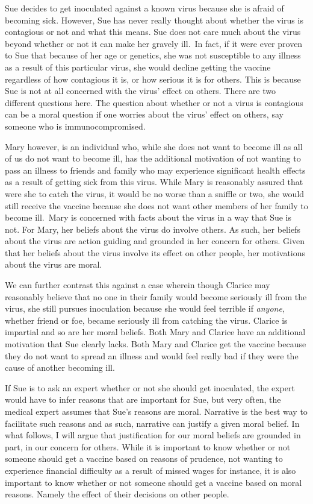 \documentclass[
  12pt,
]{book}
\theoremstyle{definition}
\theoremstyle{definition}
\theoremstyle{definition}
\theoremstyle{definition}
\theoremstyle{remark}
\begin{document}
Sue decides to get inoculated against a known virus because she is afraid of becoming sick. However, Sue has never really thought about whether the virus is contagious or not and what this means. Sue does not care much about the virus beyond whether or not it can make her gravely ill.~In fact, if it were ever proven to Sue that because of her age or genetics, she was not susceptible to any illness as a result of this particular virus, she would decline getting the vaccine regardless of how contagious it is, or how serious it is for others. This is because Sue is not at all concerned with the virus' effect on others. There are two different questions here. The question about whether or not a virus is contagious can be a moral question if one worries about the virus' effect on others, say someone who is immunocompromised.

Mary however, is an individual who, while she does not want to become ill as all of us do not want to become ill, has the additional motivation of not wanting to pass an illness to friends and family who may experience significant health effects as a result of getting sick from this virus. While Mary is reasonably assured that were she to catch the virus, it would be no worse than a sniffle or two, she would still receive the vaccine because she does not want other members of her family to become ill.~Mary is concerned with facts about the virus in a way that Sue is not. For Mary, her beliefs about the virus do involve others. As such, her beliefs about the virus are action guiding and grounded in her concern for others. Given that her beliefs about the virus involve its effect on other people, her motivations about the virus are moral.

We can further contrast this against a case wherein though Clarice may reasonably believe that no one in their family would become seriously ill from the virus, she still pursues inoculation because she would feel terrible if \emph{anyone}, whether friend or foe, became seriously ill from catching the virus. Clarice is impartial and so are her moral beliefs. Both Mary and Clarice have an additional motivation that Sue clearly lacks. Both Mary and Clarice get the vaccine because they do not want to spread an illness and would feel really bad if they were the cause of another becoming ill.

If Sue is to ask an expert whether or not she should get inoculated, the expert would have to infer reasons that are important for Sue, but very often, the medical expert assumes that Sue's reasons are moral. Narrative is the best way to facilitate such reasons and as such, narrative can justify a given moral belief. In what follows, I will argue that justification for our moral beliefs are grounded in part, in our concern for others. While it is important to know whether or not someone should get a vaccine based on reasons of prudence, not wanting to experience financial difficulty as a result of missed wages for instance, it is also important to know whether or not someone should get a vaccine based on moral reasons. Namely the effect of their decisions on other people.
\end{document}
